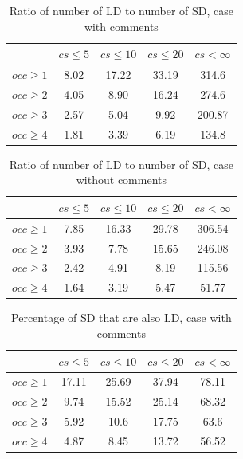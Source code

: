 \documentclass[a4paper,twoside]{article}
\begin{document}
\begin{table}[!h]
\renewcommand{\arraystretch}{1.25}
\caption{Ratio of number of LD to number of SD, case with comments}
\label{tab:ratio:comm}
\centering

\begin{tabular}{|c|c|c|c|c|}
\hline
	      &	$cs\leq 5$	&	$cs\leq 10$	&	$cs\leq 20$	&	$cs<\infty$	\\
\hline
$occ\geq 1$	&	8.02	&	17.22	&	33.19	&	314.6	\\
$occ\geq 2$	&	4.05	&	8.90	&	16.24	&	274.6	\\
$occ\geq 3$	&	2.57	&	5.04	&	9.92	&	200.87	\\
$occ\geq 4$	&	1.81	&	3.39	&	6.19	&	134.8	\\
\hline
\end{tabular}
\end{table}


\begin{table}[!h]
\renewcommand{\arraystretch}{1.25}
\caption{Ratio of number of LD to number of SD, case without comments}
\label{tab:ratio:nocomm}
\centering

\begin{tabular}{|c|c|c|c|c|}
\hline
	      &	$cs\leq 5$	&	$cs\leq 10$	&	$cs\leq 20$	&	$cs< \infty$	\\
\hline
$occ\geq 1$	&	7.85	&	16.33	&	29.78	&	306.54	\\
$occ\geq 2$	&	3.93	&	7.78	&	15.65	&	246.08	\\
$occ\geq 3$	&	2.42	&	4.91	&	8.19	&	115.56	\\
$occ\geq 4$	&	1.64	&	3.19	&	5.47	&	51.77	\\

\hline
\end{tabular}
\end{table}


\begin{table}[!h]
\renewcommand{\arraystretch}{1.25}
\caption{Percentage of SD that are also LD, case with comments}
\label{tab:percSD:comm}
\centering

\begin{tabular}{|c|c|c|c|c|}
\hline
	      &	$cs\leq 5$	&	$cs\leq 10$	&	$cs\leq 20$	&	$cs< \infty$	\\
\hline
$occ\geq 1$	&	17.11	&	25.69	&	37.94	&	78.11	\\
$occ\geq 2$	&	9.74	&	15.52	&	25.14	&	68.32	\\
$occ\geq 3$	&	5.92	&	10.6	&	17.75	&	63.6	\\
$occ\geq 4$	&	4.87	&	8.45	&	13.72	&	56.52	\\
\hline
\end{tabular}
\end{table}
\end{document}
